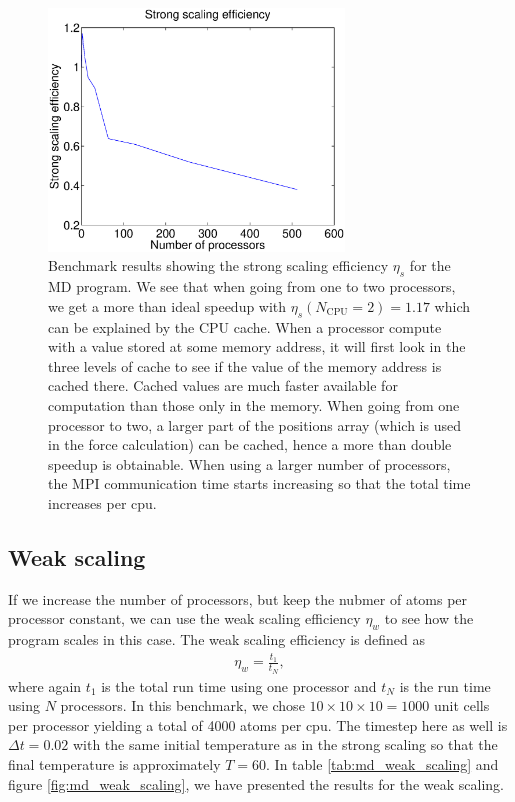 \begin{figure}[h!]
\begin{center}
\includegraphics[width=0.7\textwidth, trim=0cm 0cm 0cm 0cm, clip]{MD/figures/strong_scaling.eps}
\end{center}
\caption{Benchmark results showing the strong scaling efficiency $\eta_s$ for the MD program. We see that when going from one to two processors, we get a more than ideal speedup with $\eta_s(N_\text{CPU}=2)=1.17$ which can be explained by the CPU cache. When a processor compute with a value stored at some memory address, it will first look in the three levels of cache to see if the value of the memory address is cached there. Cached values are much faster available for computation than those only in the memory. When going from one processor to two, a larger part of the positions array (which is used in the force calculation) can be cached, hence a more than double speedup is obtainable. When using a larger number of processors, the MPI communication time starts increasing so that the total time increases per cpu.}
\label{fig:md_strong_scaling}
\end{figure}

\subsection{Weak scaling}
If we increase the number of processors, but keep the nubmer of atoms per processor constant, we can use the weak scaling efficiency $\eta_w$ to see how the program scales in this case. The weak scaling efficiency is defined as
\begin{align}
	\eta_w = \frac{t_1}{t_N},
\end{align}
where again $t_1$ is the total run time using one processor and $t_N$ is the run time using $N$ processors. In this benchmark, we chose $10\times10\times10=1000$ unit cells per processor yielding a total of 4000 atoms per cpu. The timestep here as well is $\Delta t = 0.02$ with the same initial temperature as in the strong scaling so that the final temperature is approximately $T=$\unit{60}{\kelvin}. In table \ref{tab:md_weak_scaling} and figure \ref{fig:md_weak_scaling}, we have presented the results for the weak scaling. 

